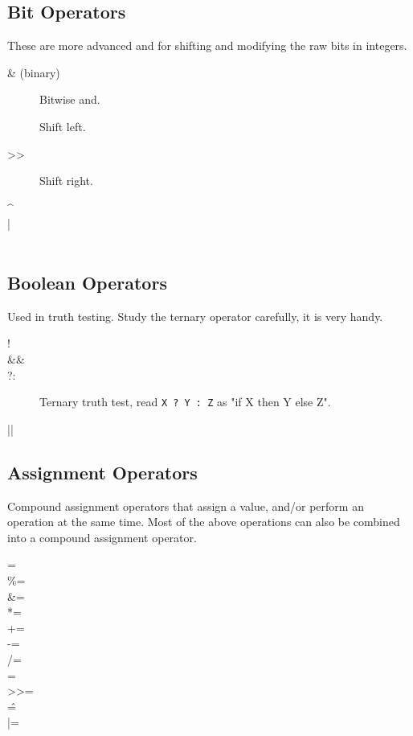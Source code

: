 \subsection{Bit Operators}

These are more advanced and for shifting and modifying the 
raw bits in integers.

\begin{description}
\item[\& (binary)] Bitwise and.
\item[\<\<] Shift left.
\item[>>] Shift right.
\item[\^]
\item[|]
\item[~]
\end{description}


\subsection{Boolean Operators}

Used in truth testing.  Study the ternary
operator carefully, it is very handy.

\begin{description}
\item[!]
\item[\&\&]
\item[?:] Ternary truth test, read \verb|X ? Y : Z| as "if X then Y else Z".
\item[||]
\end{description}

\subsection{Assignment Operators}

Compound assignment operators that assign a value, and/or perform
an operation at the same time.  Most of the above operations
can also be combined into a compound assignment operator.

\begin{description}
\item[=]
\item[\%=]
\item[&=]
\item[*=]
\item[+=]
\item[-=]
\item[/=]
\item[\<\<=]
\item[>>=]
\item[\^=]
\item[|=]
\end{description}


